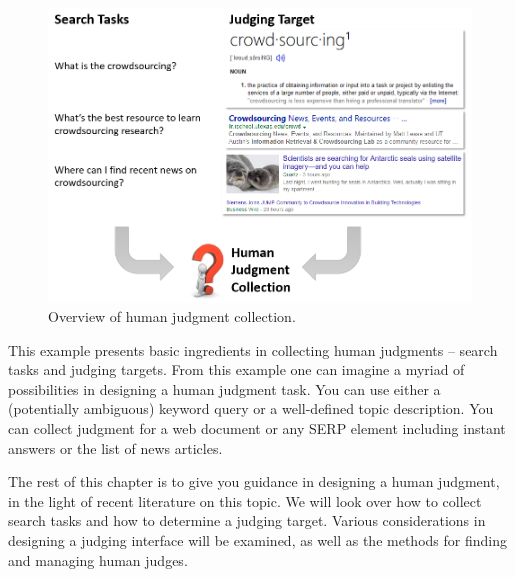 \documentclass[openany]{now} %
\begin{document}
\begin{figure}
	\begin{center}
		\includegraphics[scale=0.5]{images/human_judgment_overview}
		\caption{Overview of human judgment collection.} 
		\label{fig:human_judgment_overview}
	\end{center}
\end{figure}


This example presents basic ingredients in collecting human judgments -- search tasks and judging targets. From this example one can imagine a myriad of possibilities in designing a human judgment task. You can use either a (potentially ambiguous) keyword query or a well-defined topic description. You can collect judgment for a web document or any SERP element including instant answers or the list of news articles. 

The rest of this chapter is to give you guidance in designing a human judgment, in the light of recent literature on this topic. We will look over how to collect search tasks and how to determine a judging target. Various considerations in designing a judging interface will be examined, as well as the methods for finding and managing human judges.

\end{document}

